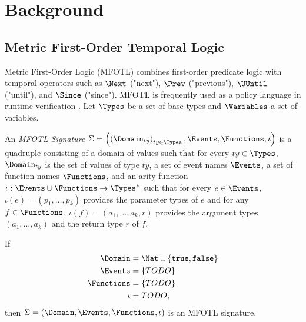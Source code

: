 \chapter{Background}
\label{chapter:background}


\section{Metric First-Order Temporal Logic}
\label{section:mfotl}

Metric First-Order Logic (MFOTL)
\cite{basin2015monitoring, chomicki1995efficient}
combines first-order predicate logic with temporal operators such as
$\Next$ ("next"), $\Prev$ ("previous"), $\UUntil$ ("until"), and $\Since$ ("since").
MFOTL is frequently used as a policy language in
runtime verification \cite{whyenf, lex, }. %
Let $\Types$ be a set of base types and $\Variables$ a set of variables.

\begin{definition}
    \label{def:mfotl-signature}
    An \emph{MFOTL Signature}
    $\Sigma = \left( \left(\Domain_{ty}\right)_{ty \in \Types},
        \Events, \Functions, \iota \right)$
    is a quadruple consisting of a domain of values such that
    for every $ty \in \Types$, $\Domain_{ty}$ is the set of values of type $ty$,
    a set of event names $\Events$, a set of function names $\Functions$,
    and an arity function $\iota : \Events \cup \Functions \to \Types^*$
    such that for every $e \in \Events$, $\iota(e) = (p_1,\dots,p_k)$ provides the
    parameter types of $e$
    and for any $f \in \Functions$, $\iota(f) = (a_1,\dots,a_k,r)$ provides the
    argument types $(a_1,\dots,a_k)$ and the return type $r$ of $f$.
\end{definition}
\begin{example}
    \label{ex:signature}
    If
    \begin{align*}
        \Domain &= \Nat \cup \left\lbrace \texttt{true}, \texttt{false} \right\rbrace \\
        \Events &= \left\lbrace TODO \right\rbrace \\ %
        \Functions &= \left\lbrace TODO \right\rbrace \\ %
        \iota &= TODO, %
    \end{align*}
    then $ \Sigma = \left( \Domain, \Events, \Functions, \iota \right) $
    is an MFOTL signature.
\end{example}

